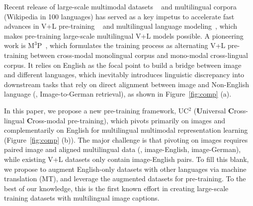 \documentclass[final]{cvpr}
\newcommand{\luowei}[1]{\textcolor{cyan}{\small{\bf [Luowei: #1 ]}}}
\newcommand{\jj}[1]{\textcolor{red}{\small{\bf [JJ: #1 ]}}}
\newcommand{\mingyang}[1]{\textcolor{brown}{\small{\bf [Mingyang: #1 ]}}}
\begin{document}
Recent release of large-scale multimodal datasets ~\cite{conceptual-caption} and multilingual corpora (\eg Wikipedia in 100 languages) has served as a key impetus to accelerate fast advances in V+L pre-training ~\cite{UNITER,vilbert,tan2019lxmert,zhou2019vlp} and multilingual language modeling~\cite{conneau2019cross,XLMR,hu2020xtreme}, which makes pre-training large-scale multilingual V+L models possible. A pioneering work is $\text{M}^3\text{P}$~\cite{huang2020m3p}, which formulates the training process as alternating V+L pre-training between cross-modal monolingual corpus and mono-modal cross-lingual corpus. %
It relies on English as the focal point to build a bridge between image and different languages, which inevitably introduces linguistic discrepancy into downstream tasks that rely on direct alignment between image and Non-English language (\eg, Image-to-German retrieval), as shown in Figure~\ref{fig:comp} (a).


In this paper, we propose a new pre-training framework, UC$^2$ (\textbf{U}niversal \textbf{C}ross-lingual \textbf{C}ross-modal pre-training), which pivots primarily on images and complementarily on English for multilingual multimodal representation learning (Figure~\ref{fig:comp} (b)). The major challenge is that pivoting on images requires paired image and aligned multilingual data (\eg, image-English, image-German), while existing V+L datasets only contain image-English pairs.
To fill this blank, we propose to augment English-only datasets with other languages via machine translation (MT), and leverage the augmented datasets for pre-training.
To the best of our knowledge, this is the first known effort in creating large-scale training datasets with multilingual image captions.
\end{document}
